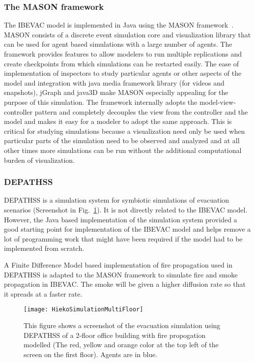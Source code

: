 \subsubsection{The MASON framework}
\label{CFW:MASON}
The IBEVAC model is implemented in Java using the MASON framework~\cite{Luke:2005wc}. MASON consists of a discrete event simulation core and visualization library that can be used for agent based simulations with a large number of agents. The framework provides features to allow modelers to run multiple replications and create checkpoints from which simulations can be restarted easily. The ease of implementation of inspectors to study particular agents or other aspects of the model and integration with java media framework library (for videos and snapshots), jGraph and java3D make MASON especially appealing for the purpose of this simulation. The framework internally adopts the model-view-controller pattern and completely decouples the view from the controller and the model and makes it easy for a modeler to adopt the same approach. This is critical for studying simulations because a visualization need only be used when particular parts of the simulation need to be observed and analyzed and at all other times more simulations can be run without the additional computational burden of visualization.



\subsubsection{DEPATHSS}
\label{CFW:Depathss}

DEPATHSS is a simulation system for symbiotic simulations of evacuation scenarios (Screenshot in Fig.~\ref{fig:DEPATHSSScreenShot}). It is not directly related to the IBEVAC model. However, the Java based implementation of the simulation system provided a good starting point for implementation of the IBEVAC model and helps remove a lot of programming work that might have been required if the model had to be implemented from scratch.

A Finite Difference Model based implementation of fire propagation used in DEPATHSS is adapted to the MASON framework to simulate fire and smoke propagation in IBEVAC. The smoke will be given a higher diffusion rate so that it spreads at a faster rate.

\begin{figure}[!tb]
\centering
\texttt{[image: HiekoSimulationMultiFloor]}
\caption[DEPATHSS Screenshot]{This figure shows a screenshot of the evacuation simulation using DEPATHSS of a 2-floor office building with fire propogation modelled (The red, yellow and orange color at the top left of the screen on the first floor). Agents are in blue.}
\label{fig:DEPATHSSScreenShot}
\end{figure}

